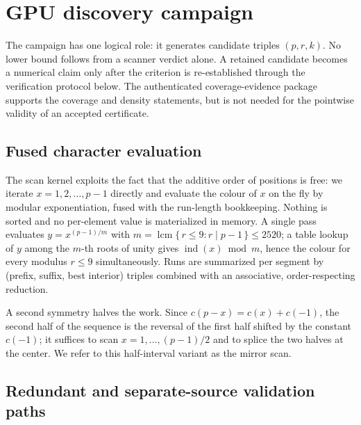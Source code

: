 \section{GPU discovery campaign}\label{s:campaign}

The campaign has one logical role: it generates candidate triples $(p,r,k)$.
No lower bound follows from a scanner verdict alone.  A retained candidate
becomes a numerical claim only after the criterion is re-established through
the verification protocol below.  The authenticated coverage-evidence package
supports the coverage and density statements, but is not needed for the
pointwise validity of an accepted certificate.

\subsection{Fused character evaluation}\label{ss:b7}

The scan kernel exploits the fact that the additive order of positions is free:
we iterate $x=1,2,\dots,p-1$ directly and evaluate the colour of $x$ on the fly
by modular exponentiation, fused with the run-length bookkeeping. Nothing is
sorted and no per-element value is materialized in memory. A single pass
evaluates $y=x^{(p-1)/m}$ with $m=\operatorname{lcm}\{\,r\le 9 : r \mid p-1\,\}
\le 2520$; a table lookup of $y$ among the $m$-th roots of unity gives
$\operatorname{ind}(x) \bmod m$, hence the colour for every modulus $r\le 9$
simultaneously. Runs are summarized per segment by (prefix, suffix, best
interior) triples combined with an associative, order-respecting reduction.

A second symmetry halves the work. Since $c(p-x)=c(x)+c(-1)$, the second half
of the sequence is the reversal of the first half shifted by the constant
$c(-1)$; it suffices to scan $x=1,\dots,(p-1)/2$ and to splice the two halves
at the center. We refer to this half-interval variant as the mirror scan.

\subsection{Redundant and separate-source validation paths}\label{ss:validation}

